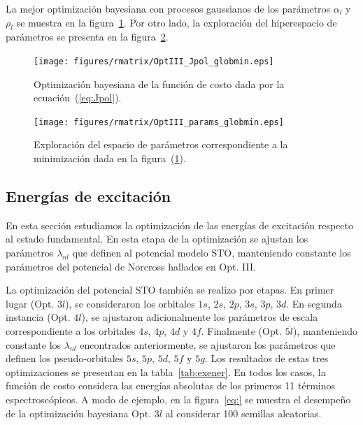 La mejor optimización bayesiana con procesos gaussianos de los parámetros 
$\alpha_l$ y $\rho_l$ se muestra en la figura~\ref{fig:OptIII-Jpol}. Por 
otro lado, la exploración del hiperespacio de parámetros se presenta en 
la figura~\ref{fig:OptIII-params}. 

\begin{figure}
\texttt{[image: figures/rmatrix/OptIII\_Jpol\_globmin.eps]}
\caption[Minimización de la función de costo.]
{Optimización bayesiana de la función de costo dada por la 
ecuación~(\ref{eq:Jpol}).}
\label{fig:OptIII-Jpol}
\end{figure}
\begin{figure}
\texttt{[image: figures/rmatrix/OptIII\_params\_globmin.eps]}
\caption[Exploración del espacio de parámetros.]
{Exploración del espacio de parámetros correspondiente a la minimización
dada en la figura~(\ref{fig:OptIII-Jpol}).}
\label{fig:OptIII-params}
\end{figure}

\newpage
\subsection{Energías de excitación}

En esta sección estudiamos la optimización de las energías de excitación 
respecto al estado fundamental. En esta etapa de la optimización se 
ajustan los parámetros $\lambda_{nl}$ que definen al potencial modelo STO, 
manteniendo constante los parámetros del potencial de Norcross hallados
en Opt. III. 

La optimización del potencial STO también se realizo por etapas. En 
primer lugar (Opt. $3l$), se consideraron los orbitales $1s$, $2s$, $2p$, 
$3s$, $3p$, $3d$. En segunda instancia (Opt. $4l$), se ajustaron 
adicionalmente los parámetros de escala correspondiente a los orbitales 
$4s$, $4p$, $4d$ y $4f$. Finalmente (Opt. $\bar{5l}$), manteniendo 
constante los $\lambda_{nl}$ encontrados anteriormente, se ajustaron los 
parámetros que definen los pseudo-orbitales $5s$, $5p$, $5d$, $5f$ y $5g$. 
Los resultados de estas tres optimizaciones se presentan en la 
tabla~\ref{tab:exener}. En todos los casos, la función de costo considera
las energías absolutas de los primeros 11 términos espectroscópicos. A 
modo de ejemplo, en la figura~\ref{eq:} se muestra el desempeño de la 
optimización bayesiana Opt. $3l$ al considerar 100 semillas aleatorias.

